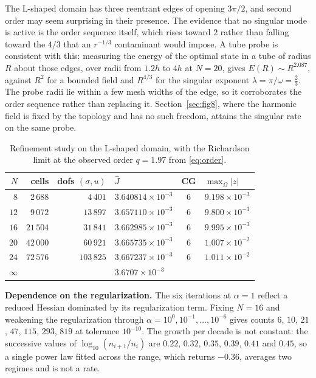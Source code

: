\documentclass{article}
\begin{document}
The L-shaped domain has three reentrant edges of opening $3\pi/2$, and second
order may seem surprising in their presence. The evidence that no singular
mode is active is the order sequence itself, which rises toward $2$ rather
than falling toward the $4/3$ that an $r^{-1/3}$ contaminant would impose. A
tube probe is consistent with this: measuring the energy of the optimal state
in a tube of radius $R$ about those edges, over radii from $1.2h$ to $4h$ at
$N=20$, gives $E(R)\sim R^{2.087}$, against $R^{2}$ for a bounded field and
$R^{4/3}$ for the singular exponent $\lambda=\pi/\omega=\tfrac23$. The probe
radii lie within a few mesh widths of the edge, so it corroborates the order
sequence rather than replacing it. Section~\ref{sec:fig8}, where the harmonic
field is fixed by the topology and has no such freedom, attains the singular
rate on the same probe.

\begin{table}[htbp]
\centering
\begin{tabular}{rrrlcl}
\toprule
$N$ & cells & dofs $(\sigma,u)$ & $\widehat J$ & CG
    & $\max_{\Omega}|z|$\\
\midrule
 $8$ &  $2\,688$ &   $4\,401$ & $3.640814\times10^{-3}$ & $6$
     & $9.198\times10^{-3}$\\
$12$ &  $9\,072$ &  $13\,897$ & $3.657110\times10^{-3}$ & $6$
     & $9.800\times10^{-3}$\\
$16$ & $21\,504$ &  $31\,841$ & $3.662985\times10^{-3}$ & $6$
     & $9.995\times10^{-3}$\\
$20$ & $42\,000$ &  $60\,921$ & $3.665735\times10^{-3}$ & $6$
     & $1.007\times10^{-2}$\\
$24$ & $72\,576$ & $103\,825$ & $3.667237\times10^{-3}$ & $6$
     & $1.011\times10^{-2}$\\
\midrule
$\infty$ & & & $3.6707\times10^{-3}$ & &\\
\bottomrule
\end{tabular}
\caption{Refinement study on the L-shaped domain, with the Richardson limit at
the observed order $q=1.97$ from \eqref{eq:order}.}
\label{tab:lshape-refine}
\end{table}

\medskip
\noindent\textbf{Dependence on the regularization.}
The six iterations at $\alpha=1$ reflect a reduced Hessian dominated by its
regularization term. Fixing $N=16$ and weakening the regularization through
$\alpha=10^{0},10^{-1},\dots,10^{-6}$ gives counts $6$, $10$, $21$, $47$,
$115$, $293$, $819$ at tolerance $10^{-10}$. The growth per decade is not
constant: the successive values of $\log_{10}(n_{i+1}/n_{i})$ are $0.22$,
$0.32$, $0.35$, $0.39$, $0.41$ and $0.45$, so a single power law fitted across
the range, which returns $-0.36$, averages two regimes and is not a rate.
\end{document}

